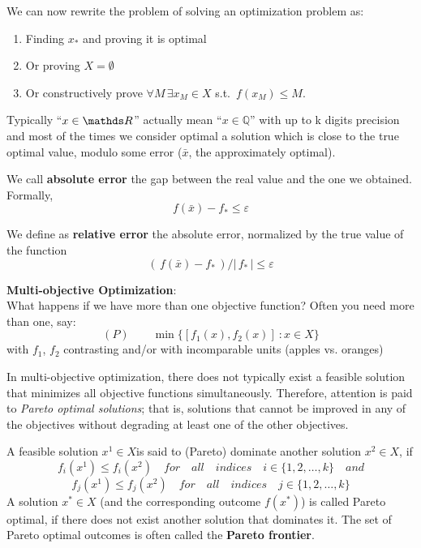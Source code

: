 \documentclass[computational_mathematics.tex]{subfiles}
\begin{document}
\noindent We can now rewrite the problem of solving an optimization problem as:
\begin{enumerate}
  \item Finding $x_*$ and proving it is optimal
  \item Or proving $X = \emptyset$
  \item Or constructively prove $\forall M \, \exists x_M \in X$ s.t.~$f(x_M) \leq M$.
\end{enumerate}

Typically “$x \in \R$” actually mean “$x \in \mathbb{Q}$” with up to k digits precision and most of the times we consider optimal a solution which is close to the true optimal value, modulo some error ($\bar{x}$, the approximately optimal).

\begin{definition}
  We call \textbf{absolute error} the gap between the real value and the one we obtained. Formally,
\[
  f(\bar{x}) - f_* \leq \varepsilon
\]
\end{definition}

\begin{definition}
  We define as \textbf{relative error} the absolute error, normalized by the true value of the function
\[
  ( \, f(\bar{x}) - f_* \, ) / | \, f_* \, | \leq \varepsilon
\]
\end{definition}

\noindent \textbf{Multi-objective Optimization}:\\
What happens if we have more than one objective function?\newline
Often you need more than one, say:
\[
  (P) \qquad \min \{[f_1(x),f_2(x)]~:x \in X\}
\]
with $f_1$, $f_2$ contrasting and/or with incomparable units (apples vs. oranges)

In multi-objective optimization, there does not typically exist a feasible solution that minimizes all objective functions simultaneously. Therefore, attention is paid to \emph{Pareto optimal solutions}; that is, solutions that cannot be improved in any of the objectives without degrading at least one of the other objectives.
\begin{definition}
   A feasible solution $x^{1} \in X$is said to (Pareto) dominate another solution $x^{2} \in X$, if
  \[
  f_{i}(x^{1})\leq f_{i}(x^{2})\quad for\quad all\quad indices\quad i \in \{ 1,2,\dots ,k\}\quad and
\]
\[
  f_{j}(x^{1})\leq f_{j}(x^{2})\quad for\quad all\quad indices\quad j \in \{ 1,2,\dots ,k\}
\]
A solution $x^{*}\in X$ (and the corresponding outcome $f(x^{*})$) is called Pareto optimal, if there does not exist another solution that dominates it. The set of Pareto optimal outcomes is often called the \textbf{Pareto frontier}.
\end{definition}
\end{document}
